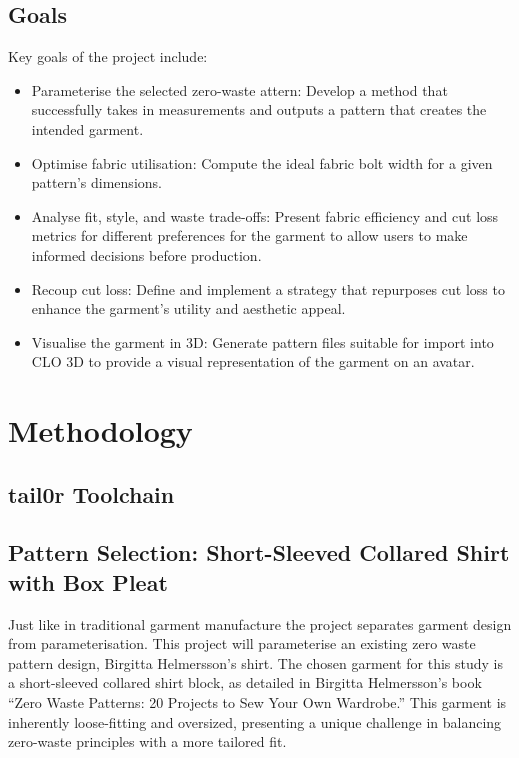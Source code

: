 \subsection{Goals}
Key goals of the project include:
\begin{itemize}
    \item Parameterise the selected zero-waste attern: Develop a method that successfully takes in measurements and outputs a pattern that creates the intended garment.
    \item Optimise fabric utilisation: Compute the ideal fabric bolt width for a given pattern's dimensions.
    \item Analyse fit, style, and waste trade-offs: Present fabric efficiency and cut loss metrics for different preferences for the garment to allow users to make informed decisions before production.
    \item Recoup cut loss: Define and implement a strategy that repurposes cut loss to enhance the garment's utility and aesthetic appeal.
    \item Visualise the garment in 3D: Generate pattern files suitable for import into CLO 3D to provide a visual representation of the garment on an avatar.
\end{itemize}

\section{Methodology}

\subsection{tail0r Toolchain}

\subsection{Pattern Selection: Short-Sleeved Collared Shirt with Box Pleat}
Just like in traditional garment manufacture the project separates garment design from parameterisation. This project will parameterise an existing zero waste pattern design, Birgitta Helmersson’s shirt.
The chosen garment for this study is a short-sleeved collared shirt block, as detailed in Birgitta Helmersson’s book “Zero Waste Patterns: 20 Projects to Sew Your Own Wardrobe.” This garment is inherently loose-fitting and oversized, presenting a unique challenge in balancing zero-waste principles with a more tailored fit.

